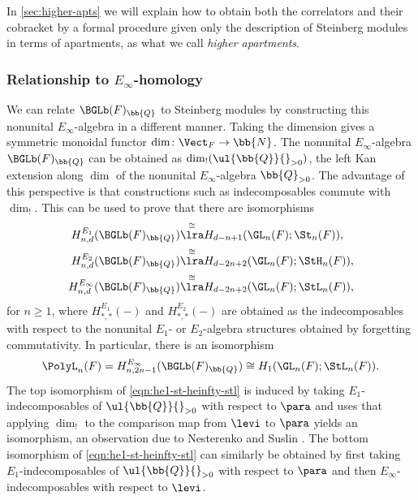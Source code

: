 \documentclass[a4paper]{amsart}
\begin{document}
\begin{remark*}In \cref{sec:higher-apts} we will explain how to obtain both the correlators and their cobracket by a formal procedure given only the description of Steinberg modules in terms of apartments, as what we call \emph{higher apartments}.\end{remark*}

\subsubsection{Relationship to $E_\infty$-homology}
We can relate $\BGLb(F)_\bb{Q}$ to Steinberg modules by constructing this nonunital $E_\infty$-algebra in a different manner. Taking the dimension gives a symmetric monoidal functor $\dim \colon \Vect_F \to \bb{N}$. The nonunital $E_\infty$-algebra $\BGLb(F)_\bb{Q}$ can be obtained as $\dim_!(\ul{\bb{Q}}{}_{>0})$, the left Kan extension along $\dim$ of the nonunital $E_\infty$-algebra $\bb{Q}_{>0}$. The advantage of this perspective is that constructions such as indecomposables commute with $\dim_!$. This can be used to prove that there are isomorphisms \cite[Section 6]{GKRW20}
\begin{equation}\label{eqn:he1-st-heinfty-stl} \begin{aligned} H^{E_1}_{n,d}(\BGLb(F)_\bb{Q}) & \overset{\cong}\lra H_{d-n+1}(\GL_n(F);\St_n(F)), \\
H^{E_2}_{n,d}(\BGLb(F)_\bb{Q}) & \overset{\cong}\lra H_{d-2n+2}(\GL_n(F);\StH_n(F)), \\
H^{E_\infty}_{n,d}(\BGLb(F)_\bb{Q}) & \overset{\cong}\lra H_{d-2n+2}(\GL_n(F);\StL_n(F)),\end{aligned}\end{equation}
for $n \geq 1$, where $H^{E_1}_{*,*}(-)$ and $H^{E_2}_{*,*}(-)$ are obtained as the indecomposables with respect to the nonunital $E_1$- or $E_2$-algebra structures obtained by forgetting commutativity. In particular, there is an isomorphism
\[\PolyL_n(F) = H^{E_\infty}_{n,2n-1}(\BGLb(F)_\bb{Q}) \cong H_1(\GL_n(F);\StL_n(F)).\]
The top isomorphism of \eqref{eqn:he1-st-heinfty-stl} is induced by taking $E_1$-indecomposables of $\ul{\bb{Q}}{}_{>0}$ with respect to $\para$ and uses that applying $\dim_!$ to the comparison map from $\levi$ to $\para$ yields an isomorphism, an observation due to Nesterenko and Suslin \cite[\S 1]{NesterenkoSuslin}. The bottom isomorphism of \eqref{eqn:he1-st-heinfty-stl} can similarly be obtained by first taking $E_1$-indecomposables of $\ul{\bb{Q}}{}_{>0}$ with respect to $\para$ and then $E_\infty$-indecomposables with respect to $\levi$.
\end{document}
